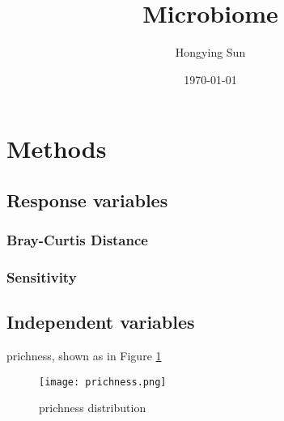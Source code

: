 \documentclass{article}
\title{Microbiome}
\author{Hongying Sun
	}
\date{\today}
\begin{document}
\maketitle

\section{Methods}
\subsection{Response variables}
\subsubsection{Bray-Curtis Distance}
\subsubsection{Sensitivity}
\subsection{Independent variables}
prichness, shown as in Figure \ref{prichness-community}
\begin{figure}[htbp]
	\centering
	\texttt{[image: prichness.png]}\\
	\caption{prichness distribution}
	\label{prichness-community}
\end{figure}
\end{document}

